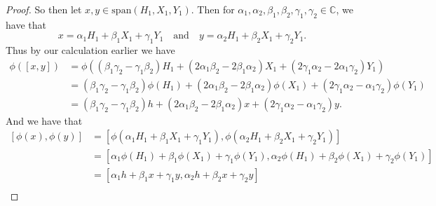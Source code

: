\documentclass[12pt]{article}
\theoremstyle{definition}
\begin{document}
\begin{enumerate}
\begin{enumerate}[label=(\alph*)]
\begin{proof}
                        So then let $x, y\in\text{span}(H_1, X_1, Y_1)$. Then
                        for $\alpha_1, \alpha_2, \beta_1, \beta_2, \gamma_1,
                        \gamma_2\in\mathbb{C}$, we have that 
                        \begin{equation*}
                            x = \alpha_1H_1+\beta_1X_1+\gamma_1Y_1\quad\text{and}\quad
                            y=\alpha_2H_1+\beta_2X_1+\gamma_2Y_1.
                        \end{equation*}
                        Thus by our calculation earlier we have
                        \begin{equation*}
                            \begin{split}
                                \phi([x, y]) &=
                                \phi((\beta_1\gamma_2-\gamma_1\beta_2)H_1
                                +(2\alpha_1\beta_2-2\beta_1\alpha_2)X_1
                                +(2\gamma_1\alpha_2-2\alpha_1\gamma_2)Y_1) \\
                                &=(\beta_1\gamma_2-\gamma_1\beta_2)\phi(H_1)
                                +(2\alpha_1\beta_2-2\beta_1\alpha_2)\phi(X_1)
                                +(2\gamma_1\alpha_2-\alpha_1\gamma_2)\phi(Y_1)
                                \\
                                &=(\beta_1\gamma_2-\gamma_1\beta_2)h
                                +(2\alpha_1\beta_2-2\beta_1\alpha_2)x
                                +(2\gamma_1\alpha_2-\alpha_1\gamma_2)y.
                            \end{split}
                        \end{equation*}
                        And we have that 
                        \begin{equation*}
                            \begin{split}
                                [\phi(x), \phi(y)] &=
                                [\phi(\alpha_1H_1+\beta_1X_1+\gamma_1Y_1),
                                \phi(\alpha_2H_1+\beta_2X_1+\gamma_2Y_1)] \\
                                &=[\alpha_1\phi(H_1)+\beta_1\phi(X_1)+\gamma_1\phi(Y_1),
                                \alpha_2\phi(H_1)+\beta_2\phi(X_1)+\gamma_2\phi(Y_1)]
                                \\
                                &=[\alpha_1 h+\beta_1 x+\gamma_1y, \alpha_2
                                h+\beta_2 x+\gamma_2 y] \\

\end{split}
\end{equation*}
\end{proof}
\end{enumerate}
\end{enumerate}
\end{document}
